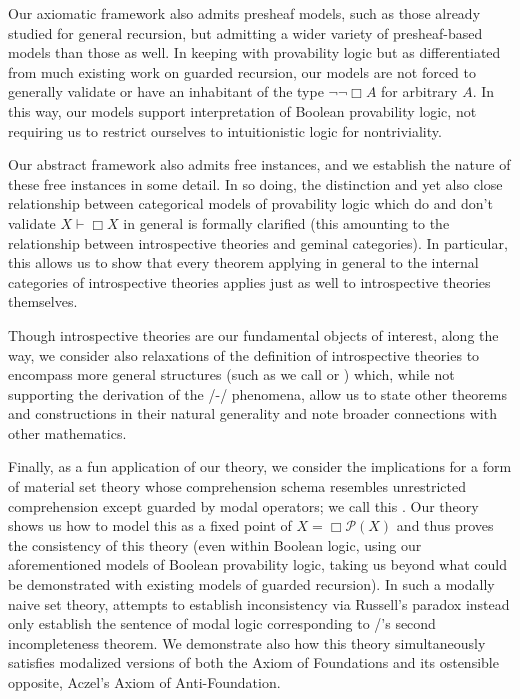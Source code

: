 Our axiomatic framework also admits presheaf models, such as those already studied for general recursion, but admitting a wider variety of presheaf-based models than those as well. In keeping with provability logic but as differentiated from much existing work on guarded recursion, our models are not forced to generally validate or have an inhabitant of the type $\neg \neg \Box A$ for arbitrary $A$. In this way, our models support interpretation of Boolean provability logic, not requiring us to restrict ourselves to intuitionistic logic for nontriviality.

Our abstract framework also admits free instances, and we establish the nature of these free instances in some detail. In so doing, the distinction and yet also close relationship between categorical models of provability logic which do and don't validate $X \vdash \Box X$ in general is formally clarified (this amounting to the relationship between introspective theories and geminal categories). In particular, this allows us to show that every theorem applying in general to the internal categories of introspective theories applies just as well to introspective theories themselves.

Though introspective theories are our fundamental objects of interest, along the way, we consider also relaxations of the definition of introspective theories to encompass more general structures (such as we call  or ) which, while not supporting the derivation of the \Godel/-\Lob/ phenomena, allow us to state other theorems and constructions in their natural generality and note broader connections with other mathematics.

Finally, as a fun application of our theory, we consider the implications for a form of material set theory whose comprehension schema resembles unrestricted comprehension except guarded by modal operators; we call this . Our theory shows us how to model this as a fixed point of $X = \Box \mathcal{P}(X)$ and thus proves the consistency of this theory (even within Boolean logic, using our aforementioned models of Boolean provability logic, taking us beyond what could be demonstrated with existing models of guarded recursion). In such a modally naive set theory, attempts to establish inconsistency via Russell's paradox instead only establish the sentence of modal logic corresponding to \Godel/'s second incompleteness theorem. We demonstrate also how this theory simultaneously satisfies modalized versions of both the Axiom of Foundations and its ostensible opposite, Aczel's Axiom of Anti-Foundation.

